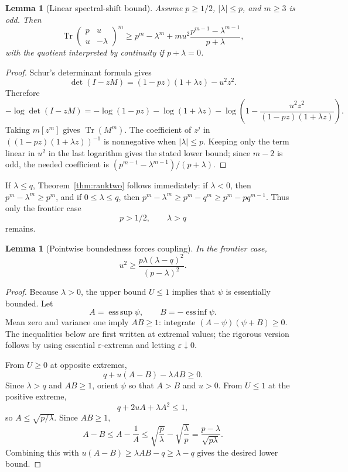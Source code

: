 \documentclass[11pt]{article}
\newtheorem{lemma}[theorem]{Lemma}
\newcommand{\Tr}{\operatorname{Tr}}
\begin{document}
\begin{lemma}[Linear spectral-shift bound]\label{lem:linear-shift-full}
Assume $p\ge1/2$, $|\lambda|\le p$, and $m\ge3$ is odd.  Then
\[
        \Tr\begin{pmatrix}p&u\\ u&-\lambda\end{pmatrix}^m
        \ge
        p^m-\lambda^m
        +m u^2\frac{p^{m-1}-\lambda^{m-1}}{p+\lambda},
\]
with the quotient interpreted by continuity if $p+\lambda=0$.
\end{lemma}

\begin{proof}
Schur's determinant formula gives
\[
        \det(I-zM)=(1-pz)(1+\lambda z)-u^2z^2.
\]
Therefore
\[
        -\log\det(I-zM)= -\log(1-pz)-\log(1+\lambda z)
        -\log\left(1-\frac{u^2z^2}{(1-pz)(1+\lambda z)}\right).
\]
Taking $m[z^m]$ gives $\Tr(M^m)$.  The coefficient of $z^j$ in $((1-pz)(1+\lambda z))^{-1}$ is nonnegative when $|\lambda|\le p$.  Keeping only the term linear in $u^2$ in the last logarithm gives the stated lower bound; since $m-2$ is odd, the needed coefficient is $(p^{m-1}-\lambda^{m-1})/(p+\lambda)$.
\end{proof}

If $\lambda\le q$, Theorem~\ref{thm:ranktwo} follows immediately: if $\lambda<0$, then $p^m-\lambda^m\ge p^m$, and if $0\le\lambda\le q$, then $p^m-\lambda^m\ge p^m-q^m\ge p^m-pq^{m-1}$.  Thus only the frontier case
\[
        p>1/2,
        \qquad \lambda>q
\]
remains.

\begin{lemma}[Pointwise boundedness forces coupling]\label{lem:ranktwo-coupling}
In the frontier case,
\[
        u^2\ge
        \frac{p\lambda(\lambda-q)^2}{(p-\lambda)^2}.
\]
\end{lemma}

\begin{proof}
Because $\lambda>0$, the upper bound $U\le1$ implies that $\psi$ is essentially bounded.  Let
\[
        A=\operatorname*{ess\,sup}\psi,
        \qquad B=-\operatorname*{ess\,inf}\psi.
\]
Mean zero and variance one imply $AB\ge1$: integrate $(A-\psi)(\psi+B)\ge0$.  The inequalities below are first written at extremal values; the rigorous version follows by using essential $\varepsilon$-extrema and letting $\varepsilon\downarrow0$.

From $U\ge0$ at opposite extremes,
\[
        q+u(A-B)-\lambda AB\ge0.
\]
Since $\lambda>q$ and $AB\ge1$, orient $\psi$ so that $A>B$ and $u>0$.  From $U\le1$ at the positive extreme,
\[
        q+2uA+\lambda A^2\le1,
\]
so $A\le\sqrt{p/\lambda}$.  Since $AB\ge1$,
\[
        A-B\le A-\frac1A\le
        \sqrt{\frac p\lambda}-\sqrt{\frac\lambda p}
        =\frac{p-\lambda}{\sqrt{p\lambda}}.
\]
Combining this with $u(A-B)\ge\lambda AB-q\ge\lambda-q$ gives the desired lower bound.
\end{proof}
\end{document}
